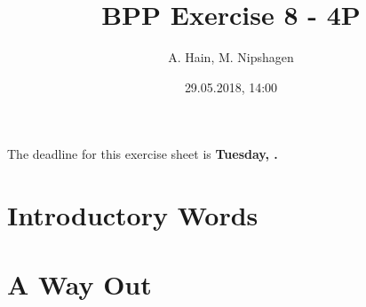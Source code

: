 
\usepackage{setspace}

\title{BPP Exercise 8 - 4P}
\author{A. Hain, M. Nipshagen}
\date{29.05.2018, 14:00}

\makeatletter
\let\thetitle\@title
\let\theauthor\@author
\let\thedate\@date
\makeatother


\newcommand\itemsub[1]{
	\begin{itemize}
		\item #1
	\end{itemize}
}





The deadline for this exercise sheet is \textbf{Tuesday, \thedate.}

\section*{Introductory Words}


\section{A Way Out}

